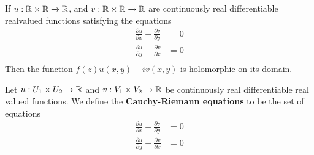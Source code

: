 \begin{theorem}\label{1.3.4}
    If $u:\mathbb{R} \times \mathbb{R} \xrightarrow{} \mathbb{R}$, and $v:\mathbb{R} \times \mathbb{R} \xrightarrow{}
    \mathbb{R}$ are continuously real differentiable realvalued functions satisfying the
    equations
    \begin{align*}
        \frac{\partial{u}}{\partial{x}}-\frac{\partial{v}}{\partial{y}} &=0 \\
        \frac{\partial{u}}{\partial{y}}+\frac{\partial{v}}{\partial{x}} &=0 \\
    \end{align*}
    Then the function $f(z)u(x,y)+iv(x,y)$ is holomorphic on its domain.
\end{theorem}

\begin{definition}
    Let $u:U_1 \times U_2 \xrightarrow{} \mathbb{R}$ and $v:V_1 \times V_2
    \xrightarrow{} \mathbb{R}$ be continuously real differentiable real valued
    functions. We define the \textbf{Cauchy-Riemann equations} to be the set of
    equations
    \begin{align*}
        \frac{\partial{u}}{\partial{x}}-\frac{\partial{v}}{\partial{y}} &=0 \\
        \frac{\partial{u}}{\partial{y}}+\frac{\partial{v}}{\partial{x}} &=0 \\
    \end{align*}
\end{definition}
